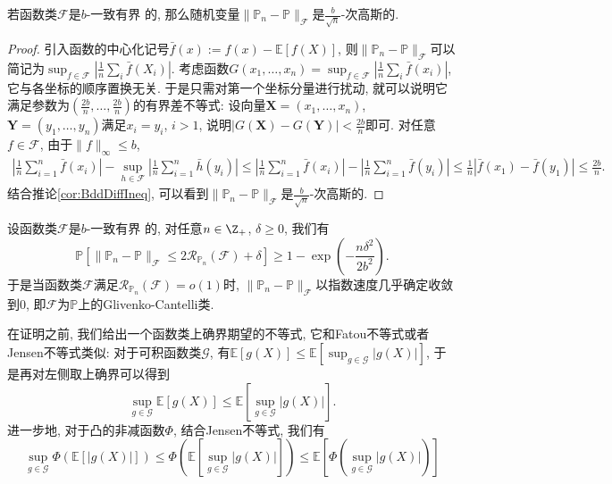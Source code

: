 \begin{lemma}
	若函数类$\mathscr{F}$是$b$-一致有界	的, 那么随机变量$\|\mathbb{P}_n - \mathbb{P}\|_{\mathscr{F}}$是$\frac{b}{\sqrt{n}}$-次高斯的. 
\end{lemma}
\begin{proof}
	引入函数的中心化记号$\bar f(x) := f(x) - \mathbb{E}[f(X)]$, 则$\|\mathbb{P}_n - \mathbb{P}\|_{\mathscr{F}}$可以简记为$\sup_{f \in \mathscr{F}} |\frac{1}{n} \sum_i \bar f(X_i)|$. 
	考虑函数$G(x_1, \dots, x_n) = \sup_{f \in \mathscr{F}} |\frac{1}{n} \sum_i \bar f(x_i)|$, 它与各坐标的顺序置换无关. 
	于是只需对第一个坐标分量进行扰动, 就可以说明它满足参数为$(\frac{2b}{n}, \dots, \frac{2b}{n})$的有界差不等式: 
	设向量$\bm{X} = (x_1, \dots, x_n)$, $\bm{Y} = (y_1, \dots, y_n)$满足$x_i = y_i$, $i > 1$, 说明$|G(\bm{X}) - G(\bm{Y})| < \frac{2b}{n}$即可. 
	对任意$f \in \mathscr{F}$, 由于$\|f\|_{\infty} \leq b$, 
	\begin{align*}
		\left|\frac{1}{n} \sum_{i=1}^n \bar f(x_i)\right| - \sup_{h \in \mathscr{F}} \left|\frac{1}{n} \sum_{i=1}^n \bar h(y_i)\right|
		\leq \left|\frac{1}{n} \sum_{i=1}^n \bar f(x_i)\right| - \left|\frac{1}{n} \sum_{i=1}^n \bar f(y_i)\right|
		\leq \frac{1}{n} |\bar f(x_1) - \bar f(y_1)| 
		\leq \frac{2b}{n}. 
	\end{align*}
	结合推论\ref{cor:BddDiffIneq}, 可以看到$\|\mathbb{P}_n - \mathbb{P}\|_{\mathscr{F}}$是$\frac{b}{\sqrt{n}}$-次高斯的. 
\end{proof}

\begin{theorem}\label{thm:EmpericalMeasureErrorUpperBddByRC}
	设函数类$\mathscr{F}$是$b$-一致有界	的, 对任意$n \in \Z_+$, $\delta \geq 0$, 我们有
	\begin{equation*}
		\mathbb{P} \left[ \|\mathbb{P}_n - \mathbb{P}\|_{\mathscr{F}} \leq 2 \mathcal{R}_{\mathbb{P}_n}(\mathscr{F}) + \delta \right]
		\geq 1 - \exp \left(- \frac{n \delta^2}{2 b^2} \right). 
	\end{equation*}
	于是当函数类$\mathscr{F}$满足$\mathcal{R}_{\mathbb{P}_n}(\mathscr{F}) = o(1)$时, $\|\mathbb{P}_n - \mathbb{P}\|_{\mathscr{F}}$以指数速度几乎确定收敛到$0$, 即$\mathscr{F}$为$\mathbb{P}$上的Glivenko-Cantelli类. 
\end{theorem}

在证明之前, 我们给出一个函数类上确界期望的不等式, 它和Fatou不等式或者Jensen不等式类似:
对于可积函数类$\mathscr{G}$, 有$\mathbb{E} [g(X)] \leq \mathbb{E}\left[ \sup_{g \in \mathscr{G}} |g(X)| \right]$, 于是再对左侧取上确界可以得到
\begin{equation}\label{eq:SupIneq}
	\sup_{g \in \mathscr{G}} \mathbb{E} [g(X)] 
	\leq  \mathbb{E}\left[ \sup_{g \in \mathscr{G}} |g(X)| \right]. 
\end{equation}
进一步地, 对于凸的非减函数$\Phi$, 结合Jensen不等式, 我们有
\begin{equation}\label{eq:SupJensenIneq}
	\sup_{g \in \mathscr{G}} \Phi(\mathbb{E} [|g(X)|])
	\leq \Phi \left( \mathbb{E} \left[ \sup_{g \in \mathscr{G}} |g(X)| \right] \right)
	\leq \mathbb{E} \left[ \Phi \left( \sup_{g \in \mathscr{G}} |g(X)| \right) \right]
\end{equation}

